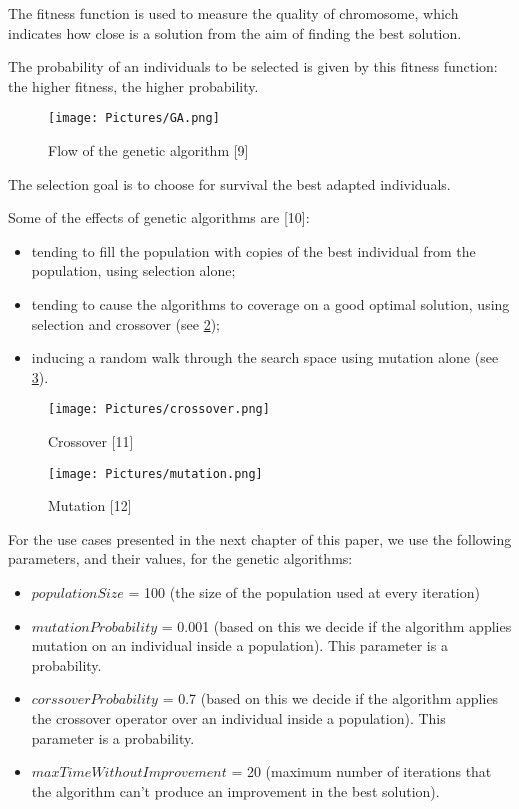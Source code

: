 The fitness function is used to measure the quality of chromosome, which indicates how close is a solution from the aim of finding the best solution.

The probability of an individuals to be selected is given by this fitness function: the higher fitness, the higher probability.

\begin{figure}
	\texttt{[image: Pictures/GA.png]}
	\caption{ Flow of the genetic algorithm [9]}
	\label{Flow of the genetic algorithm}
\end{figure}

The selection goal is to choose for survival the best adapted individuals.

Some of the effects of genetic algorithms are [10]: 
\begin{itemize}
	\item tending to fill the population with copies of the best individual from the population, using selection alone;
	\item tending to cause the algorithms to coverage on a good optimal solution, using selection and crossover (see \ref{Crossover});
	\item inducing a random walk through the search space using mutation alone
	(see \ref{Mutation}).
\end{itemize}

\begin{figure}
	\texttt{[image: Pictures/crossover.png]}
	\caption{Crossover [11]}
	\label{Crossover}
\end{figure}

\begin{figure}
	\centering
	\texttt{[image: Pictures/mutation.png]}
	\caption{Mutation [12]}
	\label{Mutation}
\end{figure}

For the use cases presented in the next chapter of this paper, we use the following parameters, and their values, for the genetic algorithms:
\begin{itemize}
	\item $populationSize$ = 100 (the size of the population used at every iteration)
	\item $mutationProbability$ = 0.001 (based on this we decide if the algorithm  applies mutation on an individual inside a population). This parameter is a probability.
	\item $corssoverProbability$ = 0.7 (based on this we decide if the algorithm applies the crossover operator over an individual inside a population). This parameter is a probability.
	\item $maxTimeWithoutImprovement$ = 20 (maximum number of iterations that the algorithm can't produce an improvement in the best solution).
\end{itemize}


